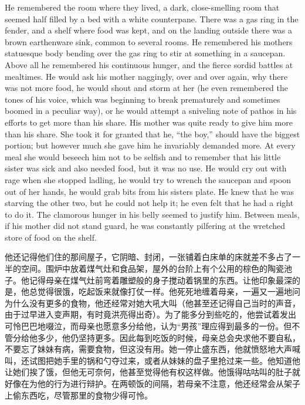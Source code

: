 \begin{paracol}{2}
He remembered the room where they lived, a dark, close-smelling room
that seemed half filled by a bed with a white counterpane. There was a
gas ring in the fender, and a shelf where food was kept, and on the
landing outside there was a brown earthenware sink, common to several
rooms. He remembered his mother\textquotesingle s statuesque body
bending over the gas ring to stir at something in a saucepan. Above all
he remembered his continuous hunger, and the fierce sordid battles at
mealtimes. He would ask his mother naggingly, over and over again, why
there was not more food, he would shout and storm at her (he even
remembered the tones of his voice, which was beginning to break
prematurely and sometimes boomed in a peculiar way), or he would attempt
a sniveling note of pathos in his efforts to get more than his share.
His mother was quite ready to give him more than his share. She took it
for granted that he, ``the boy,'' should have the biggest portion; but
however much she gave him he invariably demanded more. At every meal she
would beseech him not to be selfish and to remember that his little
sister was sick and also needed food, but it was no use. He would cry
out with rage when she stopped ladling, he would try to wrench the
saucepan and spoon out of her hands, he would grab bits from his
sister\textquotesingle s plate. He knew that he was starving the other
two, but he could not help it; he even felt that he had a right to do
it. The clamorous hunger in his belly seemed to justify him. Between
meals, if his mother did not stand guard, he was constantly pilfering at
the wretched store of food on the shelf.

\switchcolumn

他还记得他们住的那间屋子，它阴暗、封闭，一张铺着白床单的床就差不多占了一半的空间。围炉中放着煤气灶和食品架，屋外的台阶上有个公用的棕色的陶瓷池子。他记得母亲在煤气灶前弯着雕塑般的身子搅动着锅里的东西。让他印象最深的是，他总觉得很饿，吃起饭来就像打仗一样。他死死地缠着母亲，一遍又一遍地问为什么没有更多的食物，他还经常对她大吼大叫（他甚至还记得自己当时的声音，由于过早进入变声期，有时竟洪亮得出奇）。为了能多分到些吃的，他尝试着发出可怜巴巴地啜泣，而母亲也愿意多分给他，认为``男孩''理应得到最多的一份。但不管分给他多少，他仍坚持更多。因此每到吃饭的时候，母亲总会央求他不要自私，不要忘了妹妹有病，需要食物，但这没有用。她一停止盛东西，他就愤怒地大声喊叫，还试图把她手里的锅和勺夺过来，或者从妹妹的盘子里抢过来一些。他知道他让她们挨了饿，但他无可奈何，他甚至觉得他有权这样做。他饿得咕咕叫的肚子就好像在为他的行为进行辩护。在两顿饭的间隔，若母亲不注意，他还经常会从架子上偷东西吃，尽管那里的食物少得可怜。


\end{paracol}

